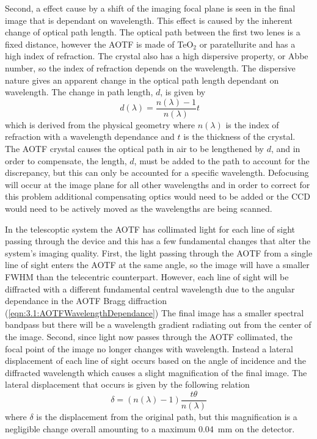 \documentclass[12pt]{article}
\begin{document}
Second, a effect cause by a shift of the imaging focal plane is seen in the final image that is dependant on wavelength. This effect is caused by the inherent change of optical path length. The optical path between the first two lenes is a fixed distance, however the AOTF is made of TeO$_{2}$ or paratellurite and has a high index of refraction. The crystal also has a high dispersive property, or Abbe number, so the index of refraction depends on the wavelength. The dispersive nature gives an apparent change in the optical path length dependant on wavelength. The change in path length, $d$, is given by
\begin{equation}
    \ d(\lambda) = \frac{n(\lambda)-1}{n(\lambda)}t
    \label{eqn:3.2:opticalPathDisplacement}
\end{equation}
which is derived from the physical geometry where $n(\lambda)$ is the index of refraction with a wavelength dependance and $t$ is the thickness of the crystal. The AOTF crystal causes the optical path in air to be lengthened by $d$, and in order to compensate, the length, $d$, must be added to the path to account for the discrepancy, but this can only be accounted for a specific wavelength. Defocusing will occur at the image plane for all other wavelengths and in order to correct for this problem additional compensating optics would need to be added or the CCD would need to be actively moved as the wavelengths are being scanned.

In the telescoptic system the AOTF has collimated light for each line of sight passing through the device and this has a few fundamental changes that alter the system's imaging quality. First, the light passing through the AOTF from a single line of sight enters the AOTF at the same angle, so the image will have a smaller FWHM than the telecentric counterpart. However, each line of sight will be diffracted with a different fundamental central wavelength due to the angular dependance in the AOTF Bragg diffraction (\autoref{eqn:3.1:AOTFWavelengthDependance}) The final image has a smaller spectral bandpass but there will be a wavelength gradient radiating out from the center of the image. Second, since light now passes through the AOTF collimated, the focal point of the image no longer changes with wavelength. Instead a lateral displacement of each line of sight occurs based on the angle of incidence and the diffracted wavelength which causes a slight magnification of the final image. The lateral displacement that occurs is given by the following relation
\begin{equation}
    \delta = (n(\lambda)-1)\frac{t\theta}{n(\lambda)}
    \label{eqn:3.2:planeParallelDiplacement}
\end{equation}
where $\delta$ is the displacement from the original path, but this magnification is a negligible change overall amounting to a maximum 0.04~mm on the detector.
\end{document}
